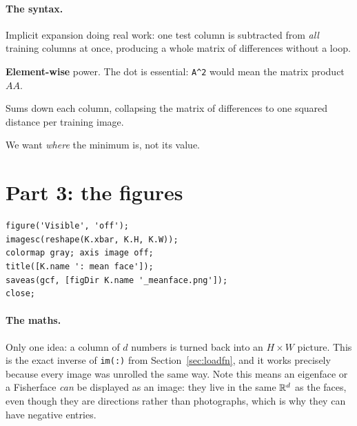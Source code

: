 \paragraph{The syntax.}
\begin{description}[leftmargin=*,style=nextline,nosep]
\item[\texttt{trainProj - testProj(:, i)}] Implicit expansion doing real work:
  one test column is subtracted from \emph{all} training columns at once,
  producing a whole matrix of differences without a loop.
\item[\texttt{.\textasciicircum 2}] \textbf{Element-wise} power. The dot is
  essential: \texttt{A\textasciicircum 2} would mean the matrix product $AA$.
\item[\texttt{sum(\ldots, 1)}] Sums down each column, collapsing the matrix of
  differences to one squared distance per training image.
\item[\texttt{[\textasciitilde, best] = min(d)}] We want \emph{where} the
  minimum is, not its value.
\end{description}

\section{Part 3: the figures}

\begin{lstlisting}
figure('Visible', 'off');
imagesc(reshape(K.xbar, K.H, K.W));
colormap gray; axis image off;
title([K.name ': mean face']);
saveas(gcf, [figDir K.name '_meanface.png']);
close;
\end{lstlisting}

\paragraph{The maths.} Only one idea: a column of $d$ numbers is turned back
into an $H\times W$ picture. This is the exact inverse of \texttt{im(:)} from
Section~\ref{sec:loadfn}, and it works precisely because every image was
unrolled the same way. Note this means an eigenface or a Fisherface
\emph{can} be displayed as an image: they live in the same $\mathbb{R}^d$ as the faces,
even though they are directions rather than photographs, which is why they can
have negative entries.

